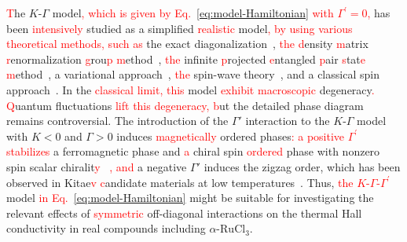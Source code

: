 \documentclass[twocolumn,superscriptaddress,showpacs, longbibliography, aps, prb]{revtex4-2}
\newcommand{\red}[1]{\textcolor{red}{#1}}
\newcommand{\orange}[1]{\textcolor{orange}{#1}}
\begin{document}
\red{T}he $K$-$\Gamma$ model\red{, which is given by Eq.~\eqref{eq:model-Hamiltonian} with $\Gamma^\prime=0$,} has been %
\red{intensively} studied %
as a simplified \red{realistic} model\red{, by %
using various theoretical methods, such as} the exact diagonalization~\cite{catuneanu2018,Yamada2020}, \red{the %
d}ensity %
\red{m}atrix %
\red{r}enormalization %
\red{g}rou\red{p %
m}ethod~\cite{Gohlke_PRB2018}, 
\red{the} infinite %
\red{p}rojected %
\red{e}ntangled %
\red{p}air %
\red{s}tat\red{e %
m}ethod~\cite{Lee_NCom2020,ZhangLLLW2023}, a variational approach~\cite{Zhang2021}, \red{the} spin-wave theory~\cite{Smit2020}, and a classical spin approach~\cite{Rayyan2021}.
In the \red{classical limit, %
this} model %
\red{exhibit macroscopic} degeneracy\red{. %
Q}uantum fluctuations %
\red{lift this degeneracy, %
b}ut the detailed phase diagram %
remains controversial.
The introduction of the $\Gamma'$ interaction to the $K$-$\Gamma$ model with $K<0$ and $\Gamma>0$ %
induces \red{magnetically} ordered phases\red{: %
a positive $\Gamma^\prime$ stabilizes} a ferromagnetic phase and \red{a} chiral spin \red{ordered} phase with nonzero spin scalar chiralit\red{y%
~\cite{Luo2022PRR,Luo2022}, and} %
a negative $\Gamma'$ induces the zigzag order, which has been observed in Kitae\red{v %
c}andidate materials at low temperatures~\cite{Rusna2019,gordon2019theory,Chern2020,Lee_NCom2020}. %
Thus, %
\red{the $K$-$\Gamma$-$\Gamma^\prime$} model \red{in Eq.~\eqref{eq:model-Hamiltonian}} might be suitable %
for investigating the relevant 
effects of \red{symmetric} off-diagonal interactions on the thermal Hall conductivity in real compounds including $\alpha$-$\mathrm{RuCl_3}$.
\end{document}
